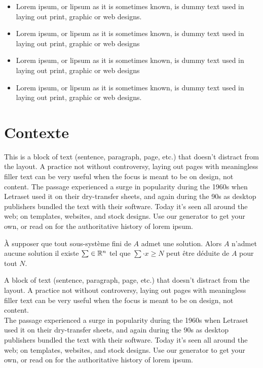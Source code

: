 \begin{itemize}[label = $\bullet$]
	\item Lorem ipsum, or lipsum as it is sometimes known, is dummy text used in laying out print, graphic or web designs.
	\item 	Lorem ipsum, or lipsum as it is sometimes known, is dummy text used in laying out print, graphic or web designs
	\item Lorem ipsum, or lipsum as it is sometimes known, is dummy text used in laying out print, graphic or web designs
	\item   Lorem ipsum, or lipsum as it is sometimes known, is dummy text used in laying out print, graphic or web designs.
\end{itemize}

\section{ Contexte}
This is a block of text (sentence, paragraph, page, etc.) that doesn't distract from the layout. A practice not without controversy, laying out pages with meaningless filler text can be very useful when the focus is meant to be on design, not content.
The passage experienced a surge in popularity during the 1960s when Letraset used it on their dry-transfer sheets, and again during the 90s as desktop publishers bundled the text with their software. Today it's seen all around the web; on templates, websites, and stock designs. Use our generator to get your own, or read on for the authoritative history of lorem ipsum.

\begin{theorem}
	À supposer que tout sous-système fini de $A$ admet une solution. Alors $A$ n'admet aucune solution \ssi il existe $\sum \in \mathbb{R}^n$ tel que $\sum \cdot x \geq N$ peut être déduite de $A$ pour tout $N$.
\end{theorem}

A block of text (sentence, paragraph, page, etc.) that doesn't distract from the layout. A practice not without controversy, laying out pages with meaningless filler text can be very useful when the focus is meant to be on design, not content.\\

The passage experienced a surge in popularity during the 1960s when Letraset used it on their dry-transfer sheets, and again during the 90s as desktop publishers bundled the text with their software. Today it's seen all around the web; on templates, websites, and stock designs. Use our generator to get your own, or read on for the authoritative history of lorem ipsum.


